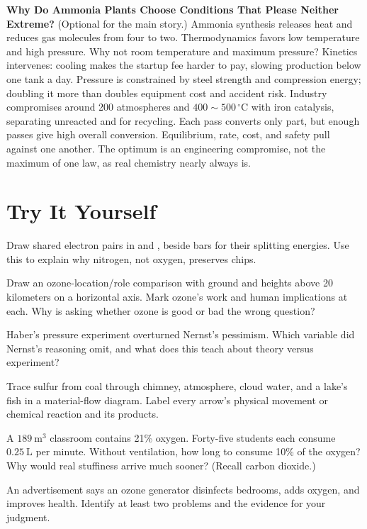 \begin{tiaozhan}
\textbf{Why Do Ammonia Plants Choose Conditions That Please Neither Extreme?} (Optional for the main story.) Ammonia synthesis releases heat and reduces gas molecules from four to two. Thermodynamics favors low temperature and high pressure. Why not room temperature and maximum pressure? Kinetics intervenes: cooling makes the  startup fee harder to pay, slowing production below one tank a day. Pressure is constrained by steel strength and compression energy; doubling it more than doubles equipment cost and accident risk. Industry compromises around 200 atmospheres and $400\sim 500\,^{\circ}\mathrm{C}$ with iron catalysis, separating unreacted  and  for recycling. Each pass converts only part, but enough passes give high overall conversion. Equilibrium, rate, cost, and safety pull against one another. The optimum is an engineering compromise, not the maximum of one law, as real chemistry nearly always is.
\end{tiaozhan}

\section*{Try It Yourself}

\begin{sikaoti}
\item Draw shared electron pairs in  and , beside bars for their splitting energies. Use this to explain why nitrogen, not oxygen, preserves chips.
\item Draw an ozone-location/role comparison with ground and heights above 20 kilometers on a horizontal axis. Mark ozone's work and human implications at each. Why is asking whether ozone is good or bad the wrong question?
\item Haber's pressure experiment overturned Nernst's pessimism. Which variable did Nernst's reasoning omit, and what does this teach about theory versus experiment?
\item Trace sulfur from coal through chimney, atmosphere, cloud water, and a lake's fish in a material-flow diagram. Label every arrow's physical movement or chemical reaction and its products.
\item A $189\ \mathrm{m^3}$ classroom contains 21\% oxygen. Forty-five students each consume $0.25\ \mathrm{L}$ per minute. Without ventilation, how long to consume 10\% of the oxygen? Why would real stuffiness arrive much sooner? (Recall carbon dioxide.)
\item An advertisement says an ozone generator disinfects bedrooms, adds oxygen, and improves health. Identify at least two problems and the evidence for your judgment.
\end{sikaoti}
